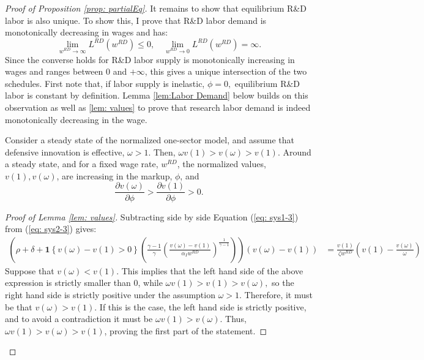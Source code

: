 \begin{proof}[Proof of Proposition \ref{prop: partialEq}]
It remains to show that equilibrium R\&D labor is also unique. To
show this, I prove that R\&D labor demand is monotonically decreasing
in wages and has:
\[
\lim_{w^{RD}\rightarrow\infty}L^{RD}(w^{RD})\leq0,\quad\lim_{w^{RD}\rightarrow0}L^{RD}(w^{RD})=\infty.
\]
 Since the converse holds for R\&D labor supply is monotonically increasing
in wages and ranges between $0$ and $+\infty$, this gives a unique
intersection of the two schedules. First note that, if labor supply
is inelastic, $\phi=0,$ equilibrium R\&D labor is constant by definition.
Lemma \ref{lem:Labor Demand} below builds on this observation as
well as \ref{lem: values} to prove that research labor demand is
indeed monotonically decreasing in the wage.
\begin{lem}
\label{lem: values}Consider a steady state of the normalized one-sector
model, and assume that defensive innovation is effective, $\omega>1$.
Then, $\omega v(1)>v(\omega)>v(1).$ Around a steady state, and for
a fixed wage rate, $w^{RD}$, the normalized values, $v(1),v(\omega)$,
are increasing in the markup, $\phi$, and
\[
\frac{\partial v(\omega)}{\partial\phi}>\frac{\partial v(1)}{\partial\phi}>0.
\]
\end{lem}
%
\begin{proof}[Proof of Lemma \ref{lem: values}]
Subtracting side by side Equation (\ref{eq: sys1-3}) from (\ref{eq: sys2-3})
gives:
\begin{align*}
\left(\rho+\delta+\bm{1}\left\{ v(\omega)-v(1)>0\right\} \left(\frac{\gamma-1}{\gamma}\left(\frac{v(\omega)-v(1)}{\alpha_{I}w^{RD}}\right)^{\frac{1}{\gamma-1}}\right)\right)\left(v(\omega)-v(1)\right) & =\frac{v(1)}{\zeta w^{RD}}\left(v(1)-\frac{v(\omega)}{\omega}\right)
\end{align*}
Suppose that $v(\omega)<v(1)$. This implies that the left hand side
of the above expression is strictly smaller than $0$, while $\omega v(1)>v(1)>v(\omega),$
so the right hand side is strictly positive under the assumption $\omega>1$.
Therefore, it must be that $v(\omega)>v(1)$. If this is the case,
the left hand side is strictly positive, and to avoid a contradiction
it must be $\omega v(1)>v(\omega).$ Thus, $\omega v(1)>v(\omega)>v(1)$,
proving the first part of the statement.


\end{proof}
\end{proof}
